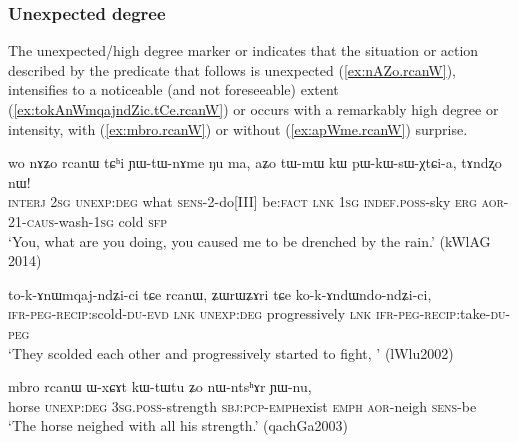 
\subsubsection{Unexpected degree} \label{sec:unexpected} 
The unexpected/high degree marker  or  indicates that the situation or action described by the predicate that follows is unexpected (\ref{ex:nAZo.rcanW}), intensifies to a noticeable (and not foreseeable) extent (\ref{ex:tokAnWmqajndZic.tCe.rcanW}) or occurs with a remarkably high degree or intensity, with  (\ref{ex:mbro.rcanW}) or without (\ref{ex:apWme.rcanW}) surprise.


\begin{exe}
	\ex \label{ex:nAZo.rcanW}
	\gll  wo nɤʑo rcanɯ tɕʰi ɲɯ-tɯ-nɤme ŋu ma,  aʑo tɯ-mɯ kɯ pɯ-kɯ-sɯ-χtɕi-a, tɤndʐo nɯ! \\
	\textsc{interj} \textsc{2sg} \textsc{unexp}:\textsc{deg} what \textsc{sens}-2-do[III] be:\textsc{fact} \textsc{lnk} \textsc{1sg} \textsc{indef}.\textsc{poss}-sky \textsc{erg} \textsc{aor}-2\fl{}1-\textsc{caus}-wash-\textsc{1sg} cold \textsc{sfp} \\
	\glt `You, what are you doing, you caused me to be drenched by the rain.' (kWlAG 2014) \\
\end{exe}

\begin{exe}
	\ex \label{ex:tokAnWmqajndZic.tCe.rcanW}
	\gll to-k-ɤnɯmqaj-ndʑi-ci tɕe rcanɯ, ʑɯrɯʑɤri tɕe ko-k-ɤndɯndo-ndʑi-ci, \\
	\textsc{ifr}-\textsc{peg}-\textsc{recip}:scold-\textsc{du}-\textsc{evd} \textsc{lnk}  \textsc{unexp}:\textsc{deg} progressively \textsc{lnk}   \textsc{ifr}-\textsc{peg}-\textsc{recip}:take-\textsc{du}-\textsc{peg} \\
	\glt `They scolded each other and progressively started to fight, ' (lWlu2002)
\end{exe}

\begin{exe}
	\ex \label{ex:mbro.rcanW}
	\gll mbro rcanɯ ɯ-xɕɤt kɯ-tɯ\redp{}tu ʑo nɯ-ntsʰɤr ɲɯ-nu, \\
	horse \textsc{unexp}:\textsc{deg} \textsc{3sg}.\textsc{poss}-strength \textsc{sbj}:\textsc{pcp}-\textsc{emph}\redp{}exist \textsc{emph} \textsc{aor}-neigh \textsc{sens}-be \\ 
	\glt `The horse neighed with all his strength.' (qachGa2003)
\end{exe}

